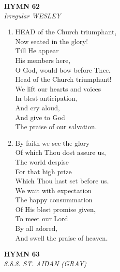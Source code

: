 \documentclass[11pt,a4paper]{article}
\begin{document}
\newpage
\begin{center}
    {\Large \textbf{HYMN 62}}
    \\
    \textit{Irregular WESLEY}
\end{center}
\vspace{1em}

\begin{enumerate}
    \item HEAD of the Church triumphant, \\
        Now seated in the glory! \\
        Till He appear \\
        His members here, \\
        O God, would bow before Thee. \\
        Head of the Church triumphant! \\
        We lift our hearts and voices \\
        In blest anticipation, \\
        And cry aloud, \\
        And give to God \\
        The praise of our salvation.

    \item By faith we see the glory \\
        Of which Thou dost assure us, \\
        The world despise \\
        For that high prize \\
        Which Thou hast set before us. \\
        We wait with expectation \\
        The happy consummation \\
        Of His blest promise given, \\
        To meet our Lord \\
        By all adored, \\
        And swell the praise of heaven.

\end{enumerate}

\newpage
\begin{center}
    {\Large \textbf{HYMN 63}}
    \\
    \textit{8.8.8. ST. AIDAN (GRAY)}
\end{center}
\vspace{1em}
\end{document}
